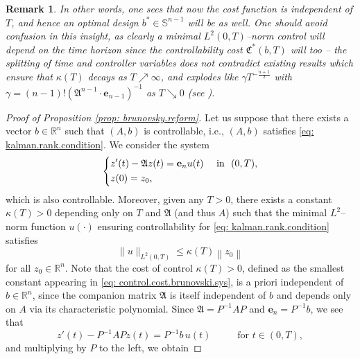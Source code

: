 \documentclass[11pt, a4paper, reqno]{amsart}
\newcommand{\R}{\mathbb{R}}
\theoremstyle{plain}
\numberwithin{equation}{section}
\newtheorem{remark}{Remark}
\begin{document}
	\begin{remark}
	In other words, one sees that now the cost function is independent of $T$, and hence an optimal design $b^*\in\mathbb{S}^{n-1}$ will be as well. One should avoid confusion in this insight, as clearly a minimal $L^2(0,T)$--norm control will depend on the time horizon since the controllability cost $\mathfrak{C}^*(b,T)$ will too -- the
splitting of time and controller variables does not contradict existing results which ensure that $\kappa(T)$ decays as $T\nearrow\infty$, and explodes like $\gamma T^{-\frac{n+1}{2}}$ with $\gamma=(n-1)!\left(\mathfrak{A}^{n-1} \cdot \mathbf{e}_{n-1}\right)^{-1}$ as $T\searrow0$ (see \citep{seidman1988violent}).	
	\end{remark}

	\begin{proof}[Proof of Proposition \ref{prop: brunovsky.reform}]
	Let us suppose that there exists a vector $b\in\R^n$ such that $(A,b)$ is controllable, i.e., $(A,b)$ satisfies \eqref{eq: kalman.rank.condition}. 
	We consider the system 
	\begin{equation} \label{eq: y.system}
	\begin{dcases}
	z'(t) - \mathfrak{A} z(t) = \mathbf{e}_n u(t) &\text{ in } (0,T), \\
	z(0) = z_0,
	\end{dcases}
	\end{equation}
	which is also controllable.
	Moreover, given any $T>0$, there exists a constant $\kappa(T)>0$ depending only on $T$ and $\mathfrak{A}$ (and thus $A$) such that the minimal $L^2$--norm function $u(\cdot)$ ensuring controllability for \eqref{eq: kalman.rank.condition} satisfies
	\begin{equation} \label{eq: control.cost.brunovski.sys}
	\|u\|_{L^2(0,T)} \leqslant \kappa(T) \left\|z_0\right\|
	\end{equation}
	for all $z_0\in\R^n$. 
	Note that the cost of control $\kappa(T)>0$, defined as the smallest constant appearing in \eqref{eq: control.cost.brunovski.sys}, is a priori independent of $b\in\R^n$, since the companion matrix $\mathfrak{A}$ is itself independent of $b$ and depends only on $A$ via its characteristic polynomial. 
	Since $\mathfrak{A} = P^{-1}AP$ and $\mathbf{e}_n = P^{-1}b$, we see that
	\begin{equation}
	z'(t) - P^{-1} A P z(t) = P^{-1}b\, u(t) \hspace{1cm} \text{ for } t\in(0,T),
	\end{equation}
	and multiplying by $P$ to the left, we obtain

\end{proof}
\end{document}
